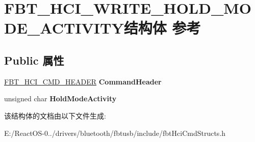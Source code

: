 \hypertarget{struct_f_b_t___h_c_i___w_r_i_t_e___h_o_l_d___m_o_d_e___a_c_t_i_v_i_t_y}{}\section{F\+B\+T\+\_\+\+H\+C\+I\+\_\+\+W\+R\+I\+T\+E\+\_\+\+H\+O\+L\+D\+\_\+\+M\+O\+D\+E\+\_\+\+A\+C\+T\+I\+V\+I\+T\+Y结构体 参考}
\label{struct_f_b_t___h_c_i___w_r_i_t_e___h_o_l_d___m_o_d_e___a_c_t_i_v_i_t_y}
\subsection*{Public 属性}
\begin{DoxyCompactItemize}
\item 
\mbox{\label{struct_f_b_t___h_c_i___w_r_i_t_e___h_o_l_d___m_o_d_e___a_c_t_i_v_i_t_y_ae4f0fe8fff936c4ee124ac5c3438e30f}} 
\hyperlink{struct_f_b_t___h_c_i___c_m_d___h_e_a_d_e_r}{F\+B\+T\+\_\+\+H\+C\+I\+\_\+\+C\+M\+D\+\_\+\+H\+E\+A\+D\+ER} {\bfseries Command\+Header}
\item 
\mbox{\label{struct_f_b_t___h_c_i___w_r_i_t_e___h_o_l_d___m_o_d_e___a_c_t_i_v_i_t_y_ad111222fda2225adbdfd8a4c10546b25}} 
unsigned char {\bfseries Hold\+Mode\+Activity}
\end{DoxyCompactItemize}


该结构体的文档由以下文件生成\+:\begin{DoxyCompactItemize}
\item 
E\+:/\+React\+O\+S-\/0../drivers/bluetooth/fbtusb/include/fbt\+Hci\+Cmd\+Structs.\+h\end{DoxyCompactItemize}
